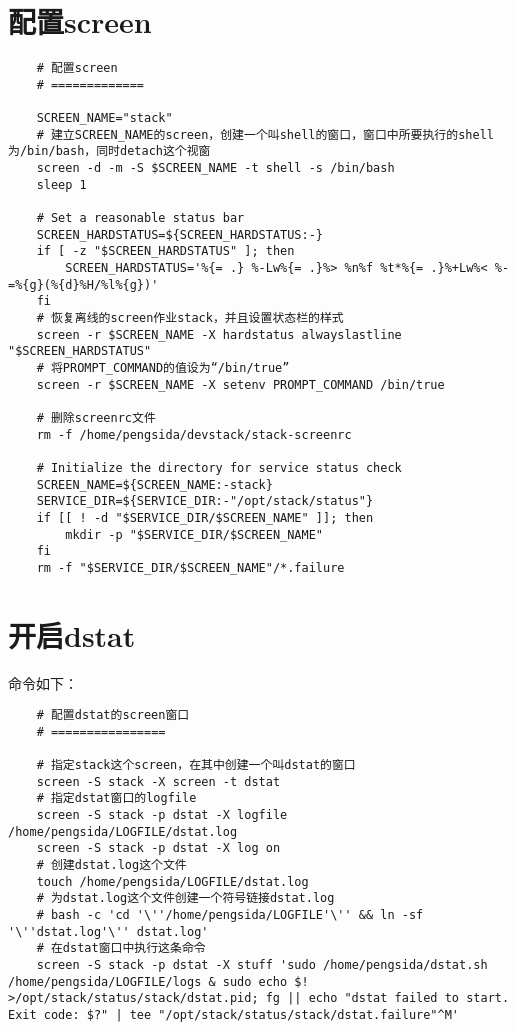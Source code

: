 \documentclass[a4paper,left=1.5cm,right=1.5cm,11pt]{article}
\begin{document}
\tableofcontents

\clearpage

\section{配置screen}
	\begin{lstlisting}
	# 配置screen
	# =============
	
	SCREEN_NAME="stack"
	# 建立SCREEN_NAME的screen，创建一个叫shell的窗口，窗口中所要执行的shell为/bin/bash，同时detach这个视窗
	screen -d -m -S $SCREEN_NAME -t shell -s /bin/bash
    sleep 1

    # Set a reasonable status bar
    SCREEN_HARDSTATUS=${SCREEN_HARDSTATUS:-}
    if [ -z "$SCREEN_HARDSTATUS" ]; then
        SCREEN_HARDSTATUS='%{= .} %-Lw%{= .}%> %n%f %t*%{= .}%+Lw%< %-=%{g}(%{d}%H/%l%{g})'
    fi
	# 恢复离线的screen作业stack，并且设置状态栏的样式
    screen -r $SCREEN_NAME -X hardstatus alwayslastline "$SCREEN_HARDSTATUS"
	# 将PROMPT_COMMAND的值设为“/bin/true”
    screen -r $SCREEN_NAME -X setenv PROMPT_COMMAND /bin/true

	# 删除screenrc文件
	rm -f /home/pengsida/devstack/stack-screenrc

	# Initialize the directory for service status check
	SCREEN_NAME=${SCREEN_NAME:-stack}
    SERVICE_DIR=${SERVICE_DIR:-"/opt/stack/status"}
    if [[ ! -d "$SERVICE_DIR/$SCREEN_NAME" ]]; then
        mkdir -p "$SERVICE_DIR/$SCREEN_NAME"
    fi
    rm -f "$SERVICE_DIR/$SCREEN_NAME"/*.failure
	\end{lstlisting}

\section{开启dstat}
	命令如下：
	\begin{lstlisting}
	# 配置dstat的screen窗口
	# ================

	# 指定stack这个screen，在其中创建一个叫dstat的窗口
	screen -S stack -X screen -t dstat
	# 指定dstat窗口的logfile
	screen -S stack -p dstat -X logfile /home/pengsida/LOGFILE/dstat.log
	screen -S stack -p dstat -X log on
	# 创建dstat.log这个文件
	touch /home/pengsida/LOGFILE/dstat.log
	# 为dstat.log这个文件创建一个符号链接dstat.log
	# bash -c 'cd '\''/home/pengsida/LOGFILE'\'' && ln -sf '\''dstat.log'\'' dstat.log'
	# 在dstat窗口中执行这条命令
	screen -S stack -p dstat -X stuff 'sudo /home/pengsida/dstat.sh /home/pengsida/LOGFILE/logs & sudo echo $! >/opt/stack/status/stack/dstat.pid; fg || echo "dstat failed to start. Exit code: $?" | tee "/opt/stack/status/stack/dstat.failure"^M'
	\end{lstlisting}
\end{document}
